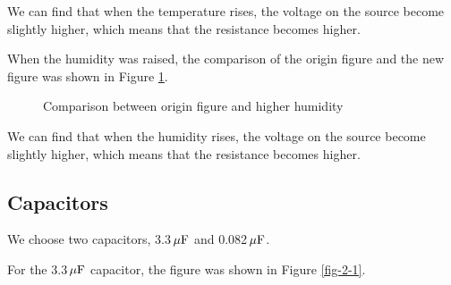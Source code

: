 \documentclass{article}
\newcommand{\unit}[1]{{\rm\,#1}}
\begin{document}
We can find that when the temperature rises, the voltage on the source become slightly higher, which means that the resistance becomes higher.

\newpage
When the humidity was raised, the comparison of the origin figure and the new figure was shown in Figure \ref{fig-1-3}.

\begin{figure}[htbp]
	\centering
	\caption{Comparison between origin figure and higher humidity}
	\label{fig-1-3}
\end{figure}

We can find that when the humidity rises, the voltage on the source become slightly higher, which means that the resistance becomes higher.

\newpage

\subsection{Capacitors}

We choose two capacitors, 3.3$\unit{\mu F}$ and 0.082$\unit{\mu F}$.

For the 3.3$\unit{\mu F}$ capacitor, the figure was shown in Figure \ref{fig-2-1}.
\end{document}
